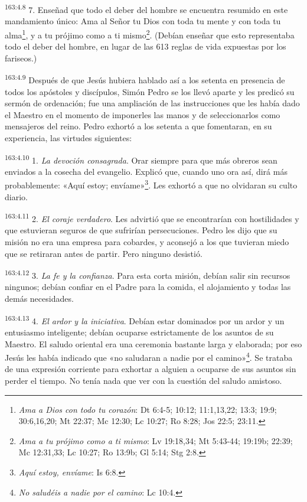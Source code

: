 \par 
\textsuperscript{163:4.8} 7. Enseñad que todo el deber del hombre se encuentra resumido en este mandamiento único: Ama al Señor tu Dios con toda tu mente y con toda tu alma\footnote{\textit{Ama a Dios con todo tu corazón}: Dt 6:4-5; 10:12; 11:1,13,22; 13:3; 19:9; 30:6,16,20; Mt 22:37; Mc 12:30; Lc 10:27; Ro 8:28; Jos 22:5; 23:11.}, y a tu prójimo como a ti mismo\footnote{\textit{Ama a tu prójimo como a ti mismo}: Lv 19:18,34; Mt 5:43-44; 19:19b; 22:39; Mc 12:31,33; Lc 10:27; Ro 13:9b; Gl 5:14; Stg 2:8.}. (Debían enseñar que esto representaba todo el deber del hombre, en lugar de las 613 reglas de vida expuestas por los fariseos.)

\par 
\textsuperscript{163:4.9} Después de que Jesús hubiera hablado así a los setenta en presencia de todos los apóstoles y discípulos, Simón Pedro se los llevó aparte y les predicó su sermón de ordenación; fue una ampliación de las instrucciones que les había dado el Maestro en el momento de imponerles las manos y de seleccionarlos como mensajeros del reino. Pedro exhortó a los setenta a que fomentaran, en su experiencia, las virtudes siguientes:

\par 
\textsuperscript{163:4.10} 1. \textit{La devoción consagrada}. Orar siempre para que más obreros sean enviados a la cosecha del evangelio. Explicó que, cuando uno ora así, dirá más probablemente: «Aquí estoy; envíame»\footnote{\textit{Aquí estoy, envíame}: Is 6:8.}. Les exhortó a que no olvidaran su culto diario.

\par 
\textsuperscript{163:4.11} 2. \textit{El coraje verdadero}. Les advirtió que se encontrarían con hostilidades y que estuvieran seguros de que sufrirían persecuciones. Pedro les dijo que su misión no era una empresa para cobardes, y aconsejó a los que tuvieran miedo que se retiraran antes de partir. Pero ninguno desistió.

\par 
\textsuperscript{163:4.12} 3. \textit{La fe y la confianza}. Para esta corta misión, debían salir sin recursos ningunos; debían confiar en el Padre para la comida, el alojamiento y todas las demás necesidades.

\par 
\textsuperscript{163:4.13} 4. \textit{El ardor y la iniciativa}. Debían estar dominados por un ardor y un entusiasmo inteligente; debían ocuparse estrictamente de los asuntos de su Maestro. El saludo oriental era una ceremonia bastante larga y elaborada; por eso Jesús les había indicado que «no saludaran a nadie por el camino»\footnote{\textit{No saludéis a nadie por el camino}: Lc 10:4.}. Se trataba de una expresión corriente para exhortar a alguien a ocuparse de sus asuntos sin perder el tiempo. No tenía nada que ver con la cuestión del saludo amistoso.

